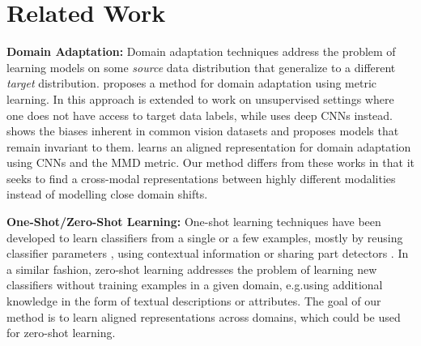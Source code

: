 \documentclass[10pt,journal,compsoc]{IEEEtran}
\begin{document}
\section{Related Work}
	\textbf{Domain Adaptation:}
		Domain adaptation techniques address the problem of learning models on some \textit{source} data distribution that generalize to a different \textit{target} distribution. \cite{saenko2010adapting} proposes a method for domain adaptation using metric learning. In \cite{gopalan2011domain} this approach is extended to work on unsupervised settings where one does not have access to target data labels, while \cite{tzeng2015simultaneous} uses deep CNNs instead. \cite{torralba2011unbiased} shows the biases inherent in common vision datasets and \cite{khosla2012undoing} proposes models that remain invariant to them. \cite{long2015learning} learns an aligned representation for domain adaptation using CNNs and the MMD metric. Our method differs from these works in that it seeks to find a cross-modal representations between highly different modalities instead of modelling close domain shifts.
	
	\textbf{One-Shot/Zero-Shot Learning:}
		One-shot learning techniques \cite{fei2006one} have been developed to learn classifiers from a single or a few examples, mostly by reusing classifier parameters \cite{fink2005object}, using contextual information \cite{murphy2004contextual,hoiem2005geometric} or sharing part detectors \cite{bart2005cross}. In a similar fashion, zero-shot learning \cite{lampert2009learning, palatucci2009zero, elhoseiny2013write, ba2015predicting,vondrick2015learning} addresses the problem of learning new classifiers without training examples in a given domain, e.g.\by using additional knowledge in the form of textual descriptions or attributes. The goal of our method is to learn aligned representations across domains, which could be used for zero-shot learning.
	
\end{document}
